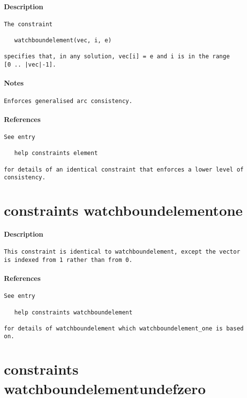 \paragraph{Description}
{\footnotesize
\begin{verbatim}
The constraint

   watchboundelement(vec, i, e)

specifies that, in any solution, vec[i] = e and i is in the range
[0 .. |vec|-1].
\end{verbatim}
}
\paragraph{Notes}
{\footnotesize
\begin{verbatim}
Enforces generalised arc consistency.
\end{verbatim}
}
\paragraph{References}
{\footnotesize
\begin{verbatim}
See entry

   help constraints element

for details of an identical constraint that enforces a lower level of
consistency.
\end{verbatim}
}
\section{constraints watchboundelement\textunderscore one}
\paragraph{Description}
{\footnotesize
\begin{verbatim}
This constraint is identical to watchboundelement, except the vector
is indexed from 1 rather than from 0.
\end{verbatim}
}
\paragraph{References}
{\footnotesize
\begin{verbatim}
See entry

   help constraints watchboundelement

for details of watchboundelement which watchboundelement_one is based on.
\end{verbatim}
}
\section{constraints watchboundelement\textunderscore undefzero}
